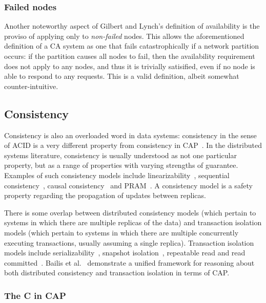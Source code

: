 \documentclass[a4paper,twocolumn,10pt]{article}
\begin{document}
\subsubsection{Failed nodes}\label{sec:failed-node-exception}

Another noteworthy aspect of Gilbert and Lynch's definition of availability is the proviso of
applying only to \emph{non-failed} nodes. This allows the aforementioned definition of a CA system
as one that fails catastrophically if a network partition occurs: if the partition causes all nodes
to fail, then the availability requirement does not apply to any nodes, and thus it is trivially
satisified, even if no node is able to respond to any requests. This is a valid definition, albeit
somewhat counter-intuitive.

\subsection{Consistency}\label{sec:consistency}

Consistency is also an overloaded word in data systems: consistency in the sense of ACID is a very
different property from consistency in CAP~\cite{Brewer2012ba}. In the distributed systems
literature, consistency is usually understood as not one particular property, but as a range of
properties with varying strengths of guarantee. Examples of such consistency models include
linearizability~\cite{Herlihy1990jq}, sequential consistency~\cite{Lamport1979ky}, causal
consistency~\cite{Ahamad1995gl} and PRAM~\cite{Lipton1988uh}. A consistency model is a safety
property regarding the propagation of updates between replicas.

There is some overlap between distributed consistency models (which pertain to systems in which
there are multiple replicas of the data) and transaction isolation models (which pertain to systems
in which there are multiple concurrently executing transactions, usually assuming a single replica).
Transaction isolation models include serializability~\cite{Bernstein1987va}, snapshot
isolation~\cite{Berenson1995kj}, repeatable read and read committed~\cite{Gray1976us}. Bailis et
al.~\cite{Bailis2014vc} demonstrate a unified framework for reasoning about both distributed
consistency and transaction isolation in terms of CAP.

\subsubsection{The C in CAP}\label{sec:c-in-cap}
\end{document}

